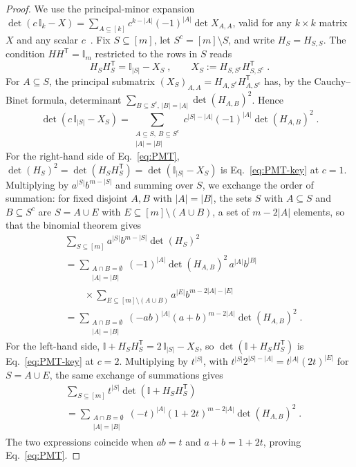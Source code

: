\documentclass[aps,prl,twocolumn,superscriptaddress,reprint,longbibliography,nofootinbib]{revtex4-2}
\newcommand{\trans}{\mathsf{T}}
\begin{document}
\begin{proof}
We use the principal-minor expansion $\det(c\,\mathbb{I}_k-X)=\sum_{A\subseteq[k]}c^{k-|A|}(-1)^{|A|}\det X_{A,A}$, valid for any $k\times k$ matrix $X$ and any scalar $c$~\cite{HornJohnson2012}. Fix $S\subseteq[m]$, let $S^c=[m]\setminus S$, and write $H_S=H_{S,S}$. The condition $HH^{\trans}=\mathbb{I}_m$ restricted to the rows in $S$ reads
\begin{equation}
    H_SH_S^{\trans}=\mathbb{I}_{|S|}-X_S\;,\qquad X_S:=H_{S,S^c}H_{S,S^c}^{\trans}\;.
\end{equation}
For $A\subseteq S$, the principal submatrix $(X_S)_{A,A}=H_{A,S^c}H_{A,S^c}^{\trans}$ has, by the Cauchy--Binet formula, determinant $\sum_{B\subseteq S^c,\,|B|=|A|}\det(H_{A,B})^2$. Hence
\begin{equation}
    \det\!\left(c\,\mathbb{I}_{|S|}-X_S\right)=\sum_{\substack{A\subseteq S,\ B\subseteq S^c\\|A|=|B|}}c^{|S|-|A|}(-1)^{|A|}\det(H_{A,B})^2\;.
    \label{eq:PMT-key}
\end{equation}
For the right-hand side of Eq.~\eqref{eq:PMT}, $\det(H_S)^2=\det(H_SH_S^{\trans})=\det(\mathbb{I}_{|S|}-X_S)$ is Eq.~\eqref{eq:PMT-key} at $c=1$. Multiplying by $a^{|S|}b^{m-|S|}$ and summing over $S$, we exchange the order of summation: for fixed disjoint $A,B$ with $|A|=|B|$, the sets $S$ with $A\subseteq S$ and $B\subseteq S^c$ are $S=A\cup E$ with $E\subseteq[m]\setminus(A\cup B)$, a set of $m-2|A|$ elements, so that the binomial theorem gives
\begin{equation}
\begin{split}
    &\sum_{S\subseteq[m]}a^{|S|}b^{m-|S|}\det(H_S)^2\\
    &=\sum_{\substack{A\cap B=\emptyset\\|A|=|B|}}(-1)^{|A|}\det(H_{A,B})^2\,a^{|A|}b^{|B|}\\
    &\qquad\times\sum_{E\subseteq[m]\setminus(A\cup B)}a^{|E|}b^{m-2|A|-|E|}\\
    &=\sum_{\substack{A\cap B=\emptyset\\|A|=|B|}}(-ab)^{|A|}(a+b)^{m-2|A|}\det(H_{A,B})^2\;.
\end{split}
\end{equation}
For the left-hand side, $\mathbb{I}+H_SH_S^{\trans}=2\,\mathbb{I}_{|S|}-X_S$, so $\det(\mathbb{I}+H_SH_S^{\trans})$ is Eq.~\eqref{eq:PMT-key} at $c=2$. Multiplying by $t^{|S|}$, with $t^{|S|}2^{|S|-|A|}=t^{|A|}(2t)^{|E|}$ for $S=A\cup E$, the same exchange of summations gives
\begin{equation}
\begin{split}
    &\sum_{S\subseteq[m]}t^{|S|}\det\!\left(\mathbb{I}+H_SH_S^{\trans}\right)\\
    &=\sum_{\substack{A\cap B=\emptyset\\|A|=|B|}}(-t)^{|A|}(1+2t)^{m-2|A|}\det(H_{A,B})^2\;.
\end{split}
\end{equation}
The two expressions coincide when $ab=t$ and $a+b=1+2t$, proving Eq.~\eqref{eq:PMT}.
\end{proof}
\end{document}
